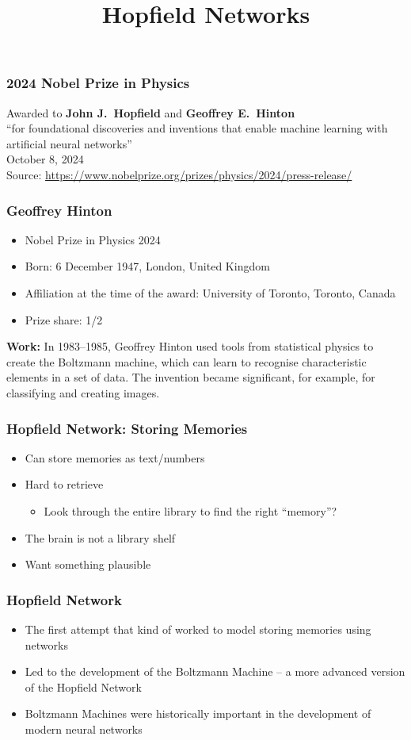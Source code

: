 \documentclass{beamer}
\title{Hopfield Networks}
\author{}
\date{}
\begin{document}
\begin{frame}
\frametitle{2024 Nobel Prize in Physics}
\centering
\Large
Awarded to \textbf{John J.\ Hopfield} and \textbf{Geoffrey E.\ Hinton}\\[1em]
\normalsize
``for foundational discoveries and inventions that enable machine learning with artificial neural networks''\\[2em]
\small
October 8, 2024\\
Source: \url{https://www.nobelprize.org/prizes/physics/2024/press-release/}
\end{frame}

\begin{frame}
\frametitle{Geoffrey Hinton}
\begin{itemize}
    \item Nobel Prize in Physics 2024
    \item Born: 6 December 1947, London, United Kingdom
    \item Affiliation at the time of the award: University of Toronto, Toronto, Canada
    \item Prize share: 1/2
\end{itemize}
\vfill
\textbf{Work:} In 1983--1985, Geoffrey Hinton used tools from statistical physics to create the Boltzmann machine, which can learn to recognise characteristic elements in a set of data. The invention became significant, for example, for classifying and creating images.
\end{frame}

\begin{frame}
\frametitle{Hopfield Network: Storing Memories}
\begin{itemize}
    \item Can store memories as text/numbers
    \item Hard to retrieve
    \begin{itemize}
        \item Look through the entire library to find the right ``memory''?
    \end{itemize}
    \item The brain is not a library shelf
    \item Want something plausible
\end{itemize}
\end{frame}

\begin{frame}
\frametitle{Hopfield Network}
\begin{itemize}
    \item The first attempt that kind of worked to model storing memories using networks
    \item Led to the development of the Boltzmann Machine -- a more advanced version of the Hopfield Network
    \item Boltzmann Machines were historically important in the development of modern neural networks
\end{itemize}
\end{frame}
\end{document}
